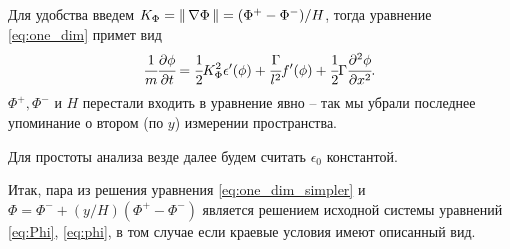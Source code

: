 Для удобства введем $K_\Phi = \| \, \nabla \Phi \, \| = (\Phi^+ - \Phi^-) / H$, тогда уравнение \eqref{eq:one_dim} примет вид
\begin{equation}
	\cfrac{1}{m} \cfrac{\partial \phi}{\partial t} = \cfrac{1}{2} K_\Phi^2 \epsilon'(\phi) + \cfrac{\Gamma}{l^2} f'(\phi) + \cfrac{1}{2} \Gamma \cfrac{\partial^2 \phi}{\partial x^2} {\text{.}}
	\label{eq:one_dim_simpler}
\end{equation}
$\Phi^+, \Phi^-$ и $H$ перестали входить в уравнение явно -- так мы убрали последнее упоминание о втором (по $y$) измерении пространства.

Для простоты анализа везде далее будем считать $\epsilon_0$ константой.

Итак, пара из решения уравнения \eqref{eq:one_dim_simpler} и $\Phi = \Phi^- + (y / H)(\Phi^+ - \Phi^-)$ является решением исходной системы уравнений \eqref{eq:Phi}, \eqref{eq:phi}, в том случае если краевые условия имеют описанный вид.